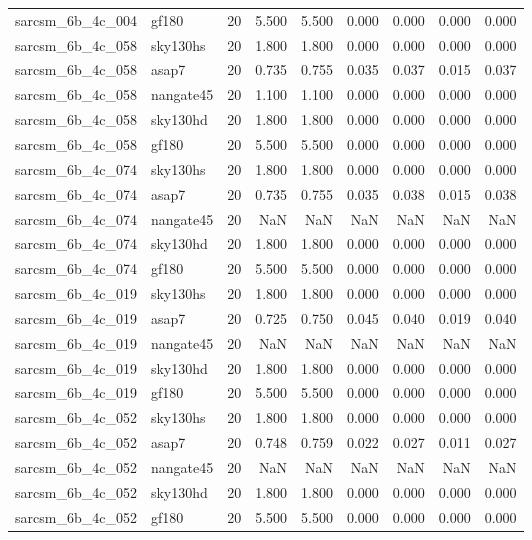 \begin{tabular}{llrrrrrrr}
sarcsm\_6b\_4c\_004 & gf180 & 20 & 5.500 & 5.500 & 0.000 & 0.000 & 0.000 & 0.000 \\
sarcsm\_6b\_4c\_058 & sky130hs & 20 & 1.800 & 1.800 & 0.000 & 0.000 & 0.000 & 0.000 \\
sarcsm\_6b\_4c\_058 & asap7 & 20 & 0.735 & 0.755 & 0.035 & 0.037 & 0.015 & 0.037 \\
sarcsm\_6b\_4c\_058 & nangate45 & 20 & 1.100 & 1.100 & 0.000 & 0.000 & 0.000 & 0.000 \\
sarcsm\_6b\_4c\_058 & sky130hd & 20 & 1.800 & 1.800 & 0.000 & 0.000 & 0.000 & 0.000 \\
sarcsm\_6b\_4c\_058 & gf180 & 20 & 5.500 & 5.500 & 0.000 & 0.000 & 0.000 & 0.000 \\
sarcsm\_6b\_4c\_074 & sky130hs & 20 & 1.800 & 1.800 & 0.000 & 0.000 & 0.000 & 0.000 \\
sarcsm\_6b\_4c\_074 & asap7 & 20 & 0.735 & 0.755 & 0.035 & 0.038 & 0.015 & 0.038 \\
sarcsm\_6b\_4c\_074 & nangate45 & 20 & NaN & NaN & NaN & NaN & NaN & NaN \\
sarcsm\_6b\_4c\_074 & sky130hd & 20 & 1.800 & 1.800 & 0.000 & 0.000 & 0.000 & 0.000 \\
sarcsm\_6b\_4c\_074 & gf180 & 20 & 5.500 & 5.500 & 0.000 & 0.000 & 0.000 & 0.000 \\
sarcsm\_6b\_4c\_019 & sky130hs & 20 & 1.800 & 1.800 & 0.000 & 0.000 & 0.000 & 0.000 \\
sarcsm\_6b\_4c\_019 & asap7 & 20 & 0.725 & 0.750 & 0.045 & 0.040 & 0.019 & 0.040 \\
sarcsm\_6b\_4c\_019 & nangate45 & 20 & NaN & NaN & NaN & NaN & NaN & NaN \\
sarcsm\_6b\_4c\_019 & sky130hd & 20 & 1.800 & 1.800 & 0.000 & 0.000 & 0.000 & 0.000 \\
sarcsm\_6b\_4c\_019 & gf180 & 20 & 5.500 & 5.500 & 0.000 & 0.000 & 0.000 & 0.000 \\
sarcsm\_6b\_4c\_052 & sky130hs & 20 & 1.800 & 1.800 & 0.000 & 0.000 & 0.000 & 0.000 \\
sarcsm\_6b\_4c\_052 & asap7 & 20 & 0.748 & 0.759 & 0.022 & 0.027 & 0.011 & 0.027 \\
sarcsm\_6b\_4c\_052 & nangate45 & 20 & NaN & NaN & NaN & NaN & NaN & NaN \\
sarcsm\_6b\_4c\_052 & sky130hd & 20 & 1.800 & 1.800 & 0.000 & 0.000 & 0.000 & 0.000 \\
sarcsm\_6b\_4c\_052 & gf180 & 20 & 5.500 & 5.500 & 0.000 & 0.000 & 0.000 & 0.000 \\

\end{tabular}

